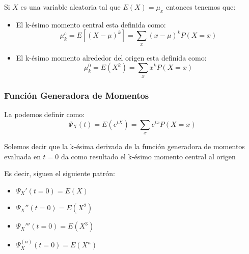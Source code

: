 \documentclass[12pt, fleqn]{report}                             %
\theoremstyle{break}                                            %
\newcommand{\Wrap}[1]           {\left( #1 \right)}             %
\newcommand{\Brackets}[1]       {\left[ #1 \right]}             %
\begin{document}
                Si $X$ es una variable aleatoria tal que $E(X) = \mu_x$ entonces tenemos que:
                \begin{itemize}
                    \item 
                        El k-ésimo momento central esta definida como:
                        \begin{equation}
                            \mu_k^c 
                                = E\Brackets{(X - \mu)^k}
                                = \sum_x (x - \mu)^k P(X = x)
                        \end{equation}

                    \item 
                        El k-ésimo momento alrededor del origen esta definida como:
                        \begin{equation}
                            \mu_k^0 
                                = E\Wrap{X^k}
                                = \sum_x x^k P(X = x)
                        \end{equation}

                \end{itemize}






                \clearpage
                \subsubsection{Función Generadora de Momentos}

                    La podemos definir como:
                    \begin{equation*}
                        \Psi_X (t) 
                            = E(e^{tX})
                            = \sum_x e^{tx} P(X = x)
                    \end{equation*}

                    Solemos decir que la k-ésima derivada de la función generadora
                    de momentos evaluada en $t = 0$ da como resultado el k-ésimo momento central al origen

                    Es decir, siguen el siguiente patrón:
                    \begin{itemize}
                        \item $\Psi_X' (t = 0) = E(X)$ 
                        \item $\Psi_X'' (t = 0) = E(X^2)$ 
                        \item $\Psi_X''' (t = 0) = E(X^3)$ 
                        \item $\Psi_X^{(n)} (t = 0) = E(X^n)$ 
                    \end{itemize}
\end{document}
